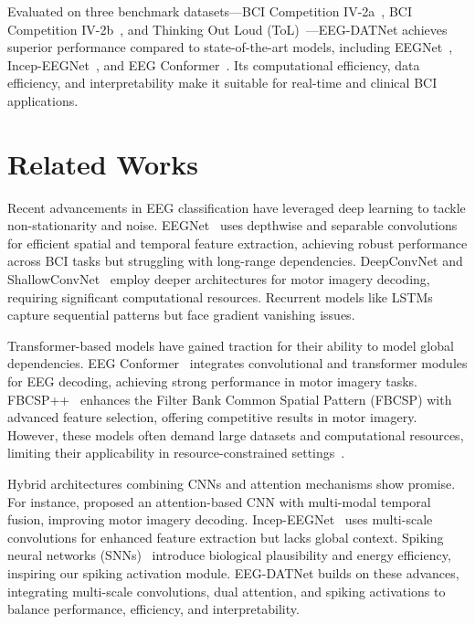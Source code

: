 \documentclass[pdflatex,sn-mathphys-num]{sn-jnl}%
\theoremstyle{thmstyleone}
\theoremstyle{thmstyletwo}
\theoremstyle{thmstylethree}
\begin{document}
Evaluated on three benchmark datasets—BCI Competition IV-2a~\cite{tangermann2012review}, BCI Competition IV-2b~\cite{leeb2008graz2b}, and Thinking Out Loud (ToL)~\cite{nieto2022thinking}—EEG-DATNet achieves superior performance compared to state-of-the-art models, including EEGNet~\cite{lawhern2018eegnet}, Incep-EEGNet~\cite{zhang2020inception}, and EEG Conformer~\cite{song2023eeg}. Its computational efficiency, data efficiency, and interpretability make it suitable for real-time and clinical BCI applications.

\section{Related Works}

Recent advancements in EEG classification have leveraged deep learning to tackle non-stationarity and noise. EEGNet~\cite{lawhern2018eegnet} uses depthwise and separable convolutions for efficient spatial and temporal feature extraction, achieving robust performance across BCI tasks but struggling with long-range dependencies. DeepConvNet and ShallowConvNet~\cite{schirrmeister2017deep} employ deeper architectures for motor imagery decoding, requiring significant computational resources. Recurrent models like LSTMs~\cite{craik2019deep} capture sequential patterns but face gradient vanishing issues.

Transformer-based models have gained traction for their ability to model global dependencies. EEG Conformer~\cite{song2023eeg} integrates convolutional and transformer modules for EEG decoding, achieving strong performance in motor imagery tasks. FBCSP++~\cite{ang2008filter} enhances the Filter Bank Common Spatial Pattern (FBCSP) with advanced feature selection, offering competitive results in motor imagery. However, these models often demand large datasets and computational resources, limiting their applicability in resource-constrained settings~\cite{vafaei2025transformers}.

Hybrid architectures combining CNNs and attention mechanisms show promise. For instance, \citet{ma2024attention} proposed an attention-based CNN with multi-modal temporal fusion, improving motor imagery decoding. Incep-EEGNet~\cite{zhang2020inception} uses multi-scale convolutions for enhanced feature extraction but lacks global context. Spiking neural networks (SNNs)~\cite{neftci2019surrogate, Stanojevic2024-lf} introduce biological plausibility and energy efficiency, inspiring our spiking activation module. EEG-DATNet builds on these advances, integrating multi-scale convolutions, dual attention, and spiking activations to balance performance, efficiency, and interpretability.
\end{document}
